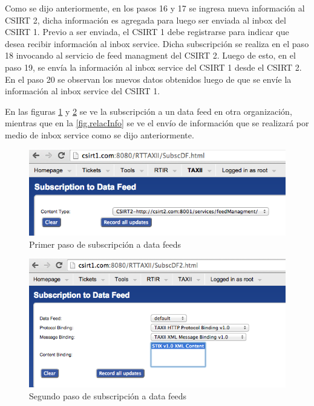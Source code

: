 Como se dijo anteriormente, en los pasos 16 y 17 se ingresa nueva información al CSIRT 2, dicha información es agregada para luego ser enviada al inbox del CSIRT 1. Previo a ser enviada, el CSIRT 1 debe registrarse para indicar que desea recibir información al inbox service. Dicha subscripción se realiza en el paso 18 invocando al servicio de feed managment del CSIRT 2. Luego de esto, en el paso 19, se envía la información al inbox service del CSIRT 1 desde el CSIRT 2.
En el paso 20 se observan los nuevos datos obtenidos luego de que se envíe la información al inbox service del CSIRT 1.

En las figuras \ref{fig.subfeed} y \ref{fig.subdf} se ve la subscripción a un data feed en otra organización, mientras que en la \ref{fig.relacInfo} se ve el envío de información que se realizará por medio de inbox service como se dijo anteriormente.

\begin{figure}[h!]
	\centering
	\includegraphics[scale=0.4]{caso-de-estudio/subscriptionfeed.png}
	\caption{Primer paso de subscripción a data feeds}
	\label{fig.subfeed}
\end{figure}

\begin{figure}[h!]
	\centering
	\includegraphics[scale=0.4]{caso-de-estudio/subscriptiondf.png}
	\caption{Segundo paso de subscripción a data feeds}
	\label{fig.subdf}
\end{figure}

